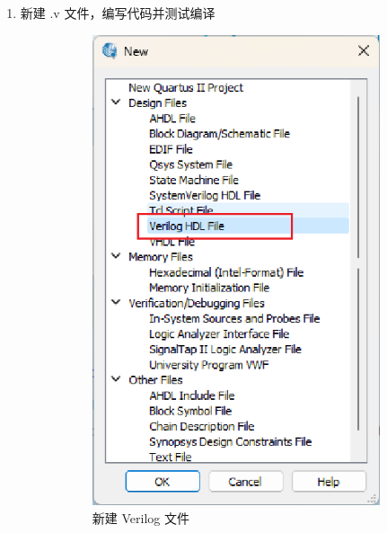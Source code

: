 \documentclass[UTF8]{article}
\theoremstyle{MyLineTheoremStyle} %
\theoremstyle{MyBlockTheoremStyle} %
\theoremstyle{MySubsubsectionStyle} %
\begin{document}
\begin{enumerate}
    \item 新建 .v 文件，编写代码并测试编译
    \begin{figure}[H]
        \centering
        \begin{subfigure}{0.3\textwidth}
            \centering
            \includegraphics[width=\linewidth]{step2.png}
            \caption{新建 Verilog 文件}
            \label{fig:step2}
        \end{subfigure}
        \hfill
        \begin{subfigure}{0.68\textwidth}
            \centering

\end{subfigure}
\end{figure}
\end{enumerate}
\end{document}
